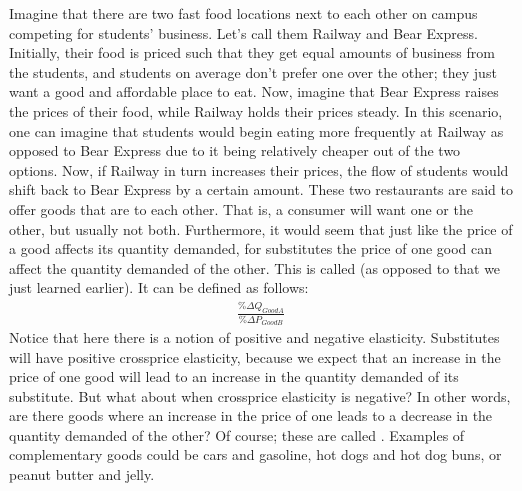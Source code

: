 \documentclass[letterpaper,10pt,english]{jupyterBook}
\begin{document}
\sphinxAtStartPar
Imagine that there are two fast food locations next to each other on campus competing for students’ business. Let’s call them Railway and Bear Express. Initially, their food is priced such that they get equal amounts of business from the students, and students on average don’t prefer one over the other; they just want a good and affordable place to eat. Now, imagine that Bear Express raises the prices of their food, while Railway holds their prices steady. In this scenario, one can imagine that students would begin eating more frequently at Railway as opposed to Bear Express due to it being relatively cheaper out of the two options. Now, if Railway in turn increases their prices, the flow of students would shift back to Bear Express by a certain amount. These two restaurants are said to offer goods that are  to each other. That is, a consumer will want one or the other, but usually not both. Furthermore, it would seem that just like the price of a good affects its quantity demanded, for substitutes the price of one good can affect the quantity demanded of the other. This is called  (as opposed to  that we just learned earlier). It can be defined as follows:
\begin{equation*}
\begin{split}\frac{\%\Delta Q_{Good A}}{\%\Delta P_{Good B}}\end{split}
\end{equation*}
\sphinxAtStartPar
Notice that here there is a notion of positive and negative elasticity. Substitutes will have positive cross\sphinxhyphen{}price elasticity, because we expect that an increase in the price of one good will lead to an increase in the quantity demanded of its substitute. But what about when cross\sphinxhyphen{}price elasticity is negative? In other words, are there goods where an increase in the price of one leads to a decrease in the quantity demanded of the other? Of course; these are called . Examples of complementary goods could be cars and gasoline, hot dogs and hot dog buns, or peanut butter and jelly.
\end{document}
